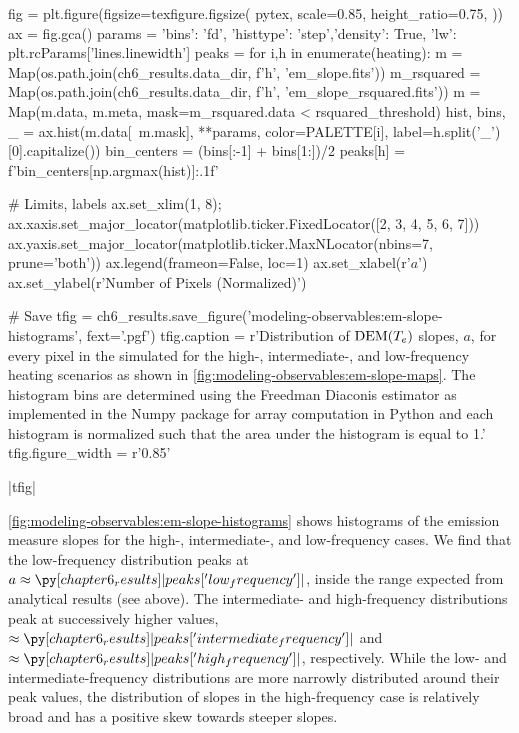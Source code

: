 \begin{pycode}
fig = plt.figure(figsize=texfigure.figsize(
    pytex,
    scale=0.85,
    height_ratio=0.75,
))
ax = fig.gca()
params = {'bins': 'fd', 'histtype': 'step','density': True, 'lw': plt.rcParams['lines.linewidth']}
peaks = {}
for i,h in enumerate(heating):
    m = Map(os.path.join(ch6_results.data_dir, f'{h}', 'em_slope.fits'))
    m_rsquared = Map(os.path.join(ch6_results.data_dir, f'{h}', 'em_slope_rsquared.fits'))
    m = Map(m.data, m.meta, mask=m_rsquared.data < rsquared_threshold)
    hist, bins, _ = ax.hist(m.data[~m.mask], **params, color=PALETTE[i],
                            label=h.split('_')[0].capitalize())
    bin_centers = (bins[:-1] + bins[1:])/2
    peaks[h] = f'{bin_centers[np.argmax(hist)]:.1f}'

# Limits, labels
ax.set_xlim(1, 8);
ax.xaxis.set_major_locator(matplotlib.ticker.FixedLocator([2, 3, 4, 5, 6, 7]))
ax.yaxis.set_major_locator(matplotlib.ticker.MaxNLocator(nbins=7, prune='both'))
ax.legend(frameon=False, loc=1)
ax.set_xlabel(r'$a$')
ax.set_ylabel(r'Number of Pixels (Normalized)')

# Save
tfig = ch6_results.save_figure('modeling-observables:em-slope-histograms', fext='.pgf')
tfig.caption = r'Distribution of $\textup{DEM}(T_e)$ slopes, $a$, for every pixel in the simulated \AR{} for the high-, intermediate-, and low-frequency heating scenarios as shown in \autoref{fig:modeling-observables:em-slope-maps}. The histogram bins are determined using the Freedman Diaconis estimator \citep{freedman_histogram_1981} as implemented in the Numpy package for array computation in Python \citep{oliphant_guide_2006} and each histogram is normalized such that the area under the histogram is equal to 1.'
tfig.figure_width = r'0.85\textwidth'  
\end{pycode}
|tfig|

\autoref{fig:modeling-observables:em-slope-histograms} shows histograms of the emission measure slopes for the high-, intermediate-, and low-frequency cases. We find that the low-frequency distribution peaks at $a\approx\py[chapter6_results]|peaks['low_frequency']|$, inside the range expected from analytical results (see above). The intermediate- and high-frequency distributions peak at successively higher values, $\approx\py[chapter6_results]|peaks['intermediate_frequency']|$ and $\approx\py[chapter6_results]|peaks['high_frequency']|$, respectively. While the low- and intermediate-frequency distributions are more narrowly distributed around their peak values, the distribution of slopes in the high-frequency case is relatively broad and has a positive skew towards steeper slopes. 

